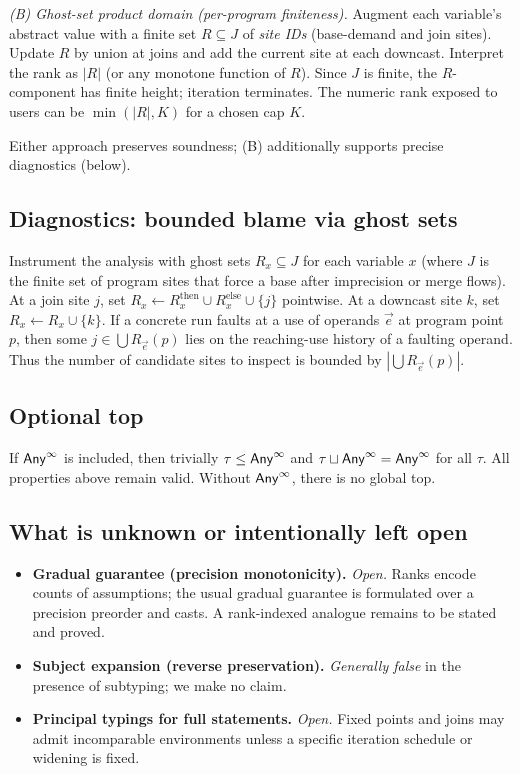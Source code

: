 \smallskip
\noindent\emph{(B) Ghost-set product domain (per-program finiteness).}
Augment each variable’s abstract value with a finite set $R\subseteq J$ of \emph{site IDs} (base-demand and join sites).
Update $R$ by union at joins and add the current site at each downcast.
Interpret the rank as $|R|$ (or any monotone function of $R$).
Since $J$ is finite, the $R$-component has finite height; iteration terminates.
The numeric rank exposed to users can be $\min(|R|,K)$ for a chosen cap $K$.

\smallskip
Either approach preserves soundness; (B) additionally supports precise diagnostics (below).

\subsection{Diagnostics: bounded blame via ghost sets}

Instrument the analysis with ghost sets $R_x\subseteq J$ for each variable $x$ (where $J$ is the finite set of program sites that force a base after imprecision or merge flows).
At a join site $j$, set $R_x \leftarrow R_x^{\mathrm{then}}\cup R_x^{\mathrm{else}}\cup\{j\}$ pointwise.
At a downcast site $k$, set $R_x \leftarrow R_x\cup\{k\}$.
If a concrete run faults at a use of operands $\vec{e}$ at program point $p$, then some $j\in \bigcup R_{\vec{e}}(p)$ lies on the reaching-use history of a faulting operand.
Thus the number of candidate sites to inspect is bounded by $|\bigcup R_{\vec{e}}(p)|$.

\subsection{Optional top}
If $\mathsf{Any}^{\infty}$ is included, then trivially $\tau\le \mathsf{Any}^{\infty}$ and $\tau\sqcup \mathsf{Any}^{\infty}=\mathsf{Any}^{\infty}$ for all $\tau$.
All properties above remain valid.
Without $\mathsf{Any}^{\infty}$, there is no global top.

\subsection{What is unknown or intentionally left open}
\begin{itemize}
\item \textbf{Gradual guarantee (precision monotonicity).} \emph{Open.}
Ranks encode counts of assumptions; the usual gradual guarantee is formulated over a precision preorder and casts. A rank-indexed analogue remains to be stated and proved.
\item \textbf{Subject expansion (reverse preservation).} \emph{Generally false} in the presence of subtyping; we make no claim.
\item \textbf{Principal typings for full statements.} \emph{Open.} Fixed points and joins may admit incomparable environments unless a specific iteration schedule or widening is fixed.
\end{itemize}

